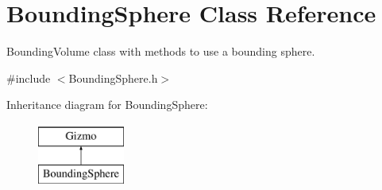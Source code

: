 \hypertarget{class_bounding_sphere}{\section{Bounding\+Sphere Class Reference}
\label{class_bounding_sphere}
}


Bounding\+Volume class with methods to use a bounding sphere.  




{\ttfamily \#include $<$Bounding\+Sphere.\+h$>$}

Inheritance diagram for Bounding\+Sphere\+:\begin{figure}[H]
\begin{center}
\leavevmode
\includegraphics[height=2.000000cm]{class_bounding_sphere}
\end{center}
\end{figure}

